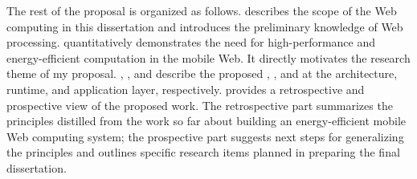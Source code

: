 The rest of the proposal is organized as follows.  describes the scope of the
Web computing in this dissertation and introduces the preliminary knowledge of Web processing.  quantitatively demonstrates the need for high-performance and energy-efficient computation in the mobile Web. It directly motivates the research theme of my proposal. , , and  describe the proposed \webcore, \webrt, and \greenweb at the architecture, runtime, and application layer, respectively.  provides a retrospective and prospective view of the proposed work. The retrospective part summarizes the principles distilled from the work so far about building an energy-efficient mobile Web computing system; the prospective part suggests next steps for generalizing the principles and outlines specific research items planned in preparing the final dissertation.
